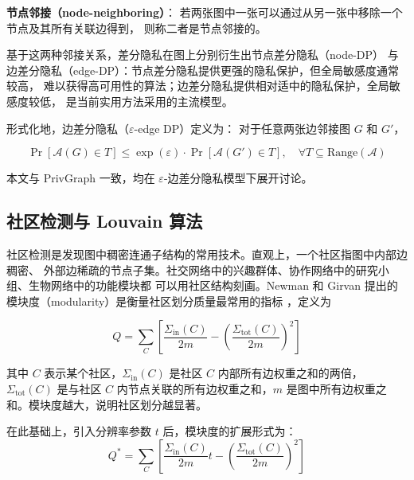 \par \textbf{节点邻接（node-neighboring）}\cite{kasiviswanathan_analyzing_2013}：
若两张图中一张可以通过从另一张中移除一个节点及其所有关联边得到，
则称二者是节点邻接的。

\par 基于这两种邻接关系，差分隐私在图上分别衍生出节点差分隐私（node-DP）
与边差分隐私（edge-DP）：节点差分隐私提供更强的隐私保护，但全局敏感度通常较高，
难以获得高可用性的算法；边差分隐私提供相对适中的隐私保护，全局敏感度较低，
是当前实用方法采用的主流模型。

\par 形式化地，边差分隐私（$\varepsilon$-edge DP）定义为：
对于任意两张边邻接图 $G$ 和 $G'$，

\begin{equation}
    \label{equ:edge-dp}
    \Pr[\mathcal{A}(G) \in T] \leq \exp(\varepsilon) \cdot \Pr[\mathcal{A}(G') \in T], \quad \forall T \subseteq \mathrm{Range}(\mathcal{A})
\end{equation}

\par 本文与 PrivGraph 一致，均在 $\varepsilon$-边差分隐私模型下展开讨论。

\subsection{社区检测与 Louvain 算法}

\par 社区检测是发现图中稠密连通子结构的常用技术。直观上，一个社区指图中内部边稠密、
外部边稀疏的节点子集。社交网络中的兴趣群体、协作网络中的研究小组、生物网络中的功能模块都
可以用社区结构刻画。Newman 和 Girvan 提出的模块度（modularity）是衡量社区划分质量最常用的指标
，定义为

\begin{equation}
    \label{equ:modularity}
    Q = \sum_{C} \left[ \frac{\Sigma_{\mathrm{in}}(C)}{2m} - \left( \frac{\Sigma_{\mathrm{tot}}(C)}{2m} \right)^2 \right]
\end{equation}

\par 其中 $C$ 表示某个社区，$\Sigma_{\mathrm{in}}(C)$ 是社区 $C$ 内部所有边权重之和的两倍，$\Sigma_{\mathrm{tot}}(C)$ 是与社区 $C$ 内节点关联的所有边权重之和，$m$ 是图中所有边权重之和。模块度越大，说明社区划分越显著。

\par 在此基础上，引入分辨率参数 $t$ 后，模块度的扩展形式为：
\begin{equation}
    \label{equ:modularity-resolution}
    Q^{*} = \sum_{C} \left[ \frac{\Sigma_{\mathrm{in}}(C)}{2m} t - \left( \frac{\Sigma_{\mathrm{tot}}(C)}{2m} \right)^2 \right]
\end{equation}

